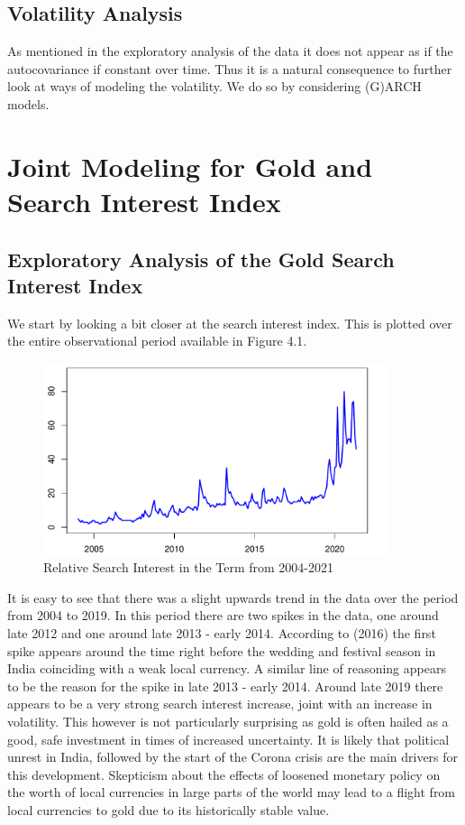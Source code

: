 \documentclass[a4paper]{article}
\theoremstyle{definition}
\begin{document}
\subsection{Volatility Analysis}
As mentioned in the exploratory analysis of the data it does not appear as if the autocovariance if constant over time. Thus it is a natural consequence to further look at ways of modeling the volatility. We do so by considering (G)ARCH models.
\newpage
\section{Joint Modeling for Gold and Search Interest Index}
\subsection{Exploratory Analysis of the Gold Search Interest Index}
We start by looking a bit closer at the search interest index. This is plotted over the entire observational period available in Figure 4.1.
	\begin{figure}[!t]
	\centering
	\caption{Relative Search Interest in the Term  from 2004-2021}
	\includegraphics[width=0.90\textwidth]{GoldSearchAlone}
	\end{figure}
It is easy to see that there was a slight upwards trend in the data over the period from 2004 to 2019. In this period there are two spikes in the data, one around late 2012 and one around late 2013 - early 2014. According to \citeauthor{Desk.24062016} (2016) the first spike appears around the time right before the wedding and festival season in India coinciding with a weak local currency. A similar line of reasoning appears to be the reason for the spike in late 2013 - early 2014. Around late 2019 there appears to be a very strong search interest increase, joint with an increase in volatility. This however is not particularly surprising as gold is often hailed as a good, safe investment in times of increased uncertainty. It is likely that political unrest in India, followed by the start of the Corona crisis are the main drivers for this development. Skepticism about the effects of loosened monetary policy on the worth of local currencies in large parts of the world may lead to a flight from local currencies to gold due to its historically stable value. 
%
\end{document}
